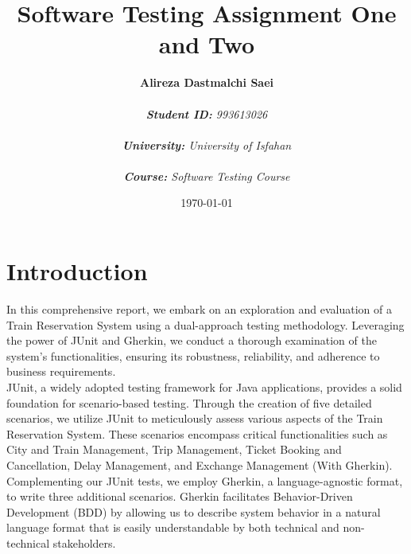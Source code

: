 \documentclass{article}
\title{\textbf{Software Testing Assignment One and Two}}
\author{\textbf{Alireza Dastmalchi Saei}\\\\
    \textit{\textbf{Student ID:} 993613026}\\\\
    \textit{\textbf{University:} University of Isfahan}\\\\
    \textit{\textbf{Course:} Software Testing Course}\\}
\date{\today}
\begin{document}
\posttitle{\end{center}\vspace{3\baselineskip}}


\maketitle

\pagebreak

\section{Introduction}


In this comprehensive report, we embark on an exploration and evaluation of a Train Reservation System using a dual-approach testing methodology. Leveraging the power of JUnit and Gherkin, we conduct a thorough examination of the system's functionalities, ensuring its robustness, reliability, and adherence to business requirements.\\

JUnit, a widely adopted testing framework for Java applications, provides a solid foundation for scenario-based testing. Through the creation of five detailed scenarios, we utilize JUnit to meticulously assess various aspects of the Train Reservation System. These scenarios encompass critical functionalities such as City and Train Management, Trip Management, Ticket Booking and Cancellation, Delay Management, and Exchange Management (With Gherkin).\\

Complementing our JUnit tests, we employ Gherkin, a language-agnostic format, to write three additional scenarios. Gherkin facilitates Behavior-Driven Development (BDD) by allowing us to describe system behavior in a natural language format that is easily understandable by both technical and non-technical stakeholders.\\
\end{document}
